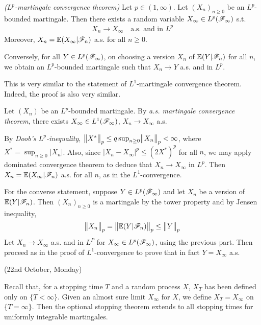 \documentclass[12pt,a4paper]{report}
\newenvironment{proof}
{\begin{changemargin}{1cm}{0.5cm} 
	}%
	{\end{changemargin}
}
\begin{document}
\emph{($L^p$-martingale convergence theorem)} Let $p\in (1,\infty)$. Let $(X_n)_{n\geq 0}$ be an $L^p$-bounded martingale. Then there exists a random variable $X_{\infty} \in L^p (\mathscr{F}_{\infty})$ s.t.
\begin{align*}
X_n \rightarrow X_{\infty} \quad \text{a.s. and in } L^p
\end{align*}
Moreover, $X_n = \mathbb{E}(X_{\infty}|\mathscr{F}_n)$ a.s. for all $n\geq 0$.

\quad Conversely, for all $Y\in L^p(\mathscr{F}_{\infty})$, on choosing a version $X_n$ of $\mathbb{E}(Y|\mathscr{F}_n)$ for all $n$, we obtain an $L^p$-bounded martingale such that $X_n \rightarrow Y$ a.s. and in $L^p$.
\s

This is very similar to the statement of $L^1$-martingale convergence theorem. Indeed, the proof is also very similar.
\begin{proof}
\pf Let $(X_n)$ be an $L^p$-bounded martingale. By \emph{a.s. martingale convergence theorem}, there exists $X_{\infty} \in L^1(\mathscr{F}_{\infty})$, $X_n\rightarrow X_{\infty}$ a.s.

\quad By \emph{Doob's $L^p$-inequality}, $\bigl\lVert X^*\bigr\rVert_{p} \leq q \sup_{n\geq 0} \bigl\lVert X_n\bigr\rVert_{p} < \infty$, where $X^* = \sup_{n\geq 0} |X_n|$. Also, since $|X_n - X_{\infty}|^p \leq (2 X^*)^p$ for all $n$, we may apply dominated convergence theorem to deduce that $X_n \rightarrow X_{\infty}$ in $L^p$. Then $X_n = \mathbb{E}(X_{\infty} |\mathscr{F}_n)$ a.s. for all $n$, as in the $L^1$-convergence.
\s

\quad For the converse statement, suppose $Y\in L^p(\mathscr{F}_{\infty})$ and let $X_n$ be a version of $\mathbb{E}(Y|\mathscr{F}_n)$. Then $(X_n)_{n\geq 0}$ is a martingale by the tower property and by Jensen inequality,
\begin{align*}
\bigl\lVert X_n\bigr\rVert_{p} = \bigl\lVert\mathbb{E}(Y|\mathscr{F}_n)\bigr\rVert_{p} \leq \bigl\lVert Y\bigr\rVert_{p}
\end{align*}
Let $X_n \rightarrow X_{\infty}$ a.s. and in $L^P$ for $X_{\infty} \in L^{p}(\mathscr{F}_{\infty})$, using the previous part. Then proceed as in the proof of $L^1$-convergence to prove that in fact $Y = X_{\infty}$ a.s. 

\eop
\end{proof}
\s

\newday

(22nd October, Monday)
\s

Recall that, for a stopping time $T$ and a random process $X$, $X_T$ has been defined only on $\{T<\infty \}$. Given an almost sure limit $X_{\infty}$ for $X$, we define $X_T = X_{\infty}$ on $\{T= \infty \}$. Then the optional stopping theorem extends to all stopping times for uniformly integrable martingales.
\s
\end{document}
